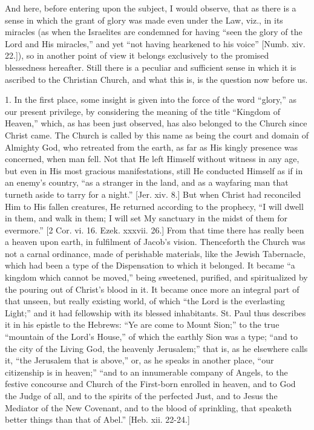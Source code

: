 And here, before entering upon the subject, I would observe, that
as there is a sense in which the grant of glory was made even under
the Law, viz., in its miracles (as when the Israelites are condemned
for having ``seen the glory of the Lord and His miracles,''
and yet ``not having hearkened to his voice'' [Numb. xiv.
22.]), so in another point of view it belongs exclusively to the
promised blessedness hereafter. Still there is a peculiar and
sufficient sense in which it is ascribed to the Christian Church, and
what this is, is the question now before us.

1. In the first place, some insight is given into the force of the
word ``glory,'' as our present privilege, by considering the
meaning of the title ``Kingdom of Heaven,'' which, as has been
just observed, has also belonged to the Church since Christ came. The
Church is called by this name as being the court and domain of
Almighty God, who retreated from the earth, as far as His kingly
presence was concerned, when man fell. Not that He left Himself
without witness in any age, but even in His most gracious
manifestations, still He conducted Himself as if in an enemy's
country, ``as a stranger in the land, and as a wayfaring man that
turneth aside to tarry for a night.'' [Jer. xiv. 8.] But when
Christ had reconciled Him to His fallen creatures, He returned
according to the prophecy, ``I will dwell in them, and walk in
them; I will set My sanctuary in the midst of them for evermore.''
[2 Cor. vi. 16. Ezek. xxxvii. 26.] From that time there has really
been a heaven upon earth, in fulfilment of Jacob's vision.
Thenceforth the Church was not a carnal ordinance, made of perishable
materials, like the Jewish Tabernacle, which had been a type of the
Dispensation to which it belonged. It became ``a kingdom which
cannot be moved,'' being sweetened, purified, and spiritualized by
the pouring out of Christ's blood in it. It became once more an
integral part of that unseen, but really existing world, of which
``the Lord is the everlasting Light;'' and it had fellowship
with its blessed inhabitants. St. Paul thus describes it in his
epistle to the Hebrews: ``Ye are come to Mount Sion;'' to the
true ``mountain of the Lord's House,'' of which the earthly
Sion was a type; ``and to the city of the Living God, the heavenly
Jerusalem;'' that is, as he elsewhere calls it, ``the Jerusalem
that is above,'' or, as he speaks in another place, ``our
citizenship is in heaven;'' ``and to an innumerable company of
Angels, to the festive concourse and Church of the First-born enrolled
in heaven, and to God the Judge of all, and to the spirits of the
perfected Just, and to Jesus the Mediator of the New Covenant, and to
the blood of sprinkling, that speaketh better things than that of
Abel.'' [Heb. xii. 22-24.]


